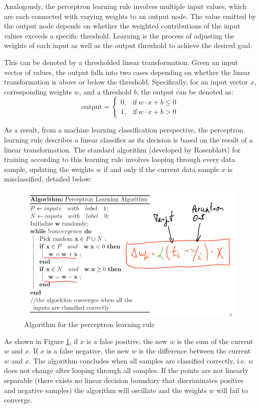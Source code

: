 \documentclass[main]{subfiles}
\begin{document}
Analogously, the perceptron learning rule involves multiple input values, which are each connected with varying weights to an output node. The value emitted by the output node depends on whether the weighted contributions of the input values exceeds a specific threshold. Learning is the process of adjusting the weights of each input as well as the output threshold to achieve the desired goal.

This can be denoted by a thresholded linear transformation. Given an input vector of values, the output falls into two cases depending on whether the linear transformation is above or below the threshold. Specifically, for an input vector $x$, corresponding weights $w$, and a threshold $b$, the output can be denoted as:
\begin{equation}
    \text{output} =
    \begin{cases}
      0, & \text{if}\ w \cdot x + b \leq 0 \\
      1, & \text{if}\ w \cdot x + b > 0
    \end{cases}
  \end{equation}

As a result, from a machine learning classification perspective, the perceptron learning rule describes a linear classifier as its decision is based on the result of a linear transformation. The standard algorithm (developed by Rosenblatt) for training according to this learning rule involves looping through every data sample, updating the weights $w$ if and only if the current data sample $x$ is misclassified, detailed below:
\begin{figure}[H]
		\centering
		\includegraphics[width=0.8\linewidth]{04_LearningRules/figures/4_1_perceptron.png}
		\caption{Algorithm for the perceptron learning rule}
		\label{fig:4_perceptron}
	\end{figure}

As shown in Figure \ref{fig:4_perceptron}, if $x$ is a false positive, the new $w$ is the sum of the current $w$ and $x$. If $x$ is a false negative, the new $w$ is the difference between the current $w$ and $x$. The algorithm concludes when all samples are classified correctly, i.e. $w$ does not change after looping through all samples. If the points are not linearly separable (there exists no linear decision boundary that discriminates positive and negative samples) the algorithm will oscillate and the weights $w$ will fail to converge.
\end{document}
